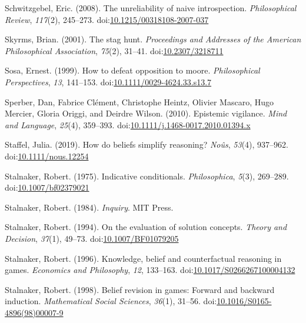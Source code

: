 \documentclass[
  12pt,
  letterpaper,
]{scrbook}
\newlength{\cslhangindent}
\newenvironment{CSLReferences}[2] %
 {\begin{list}{}{%
  \setlength{\itemindent}{0pt}
  \setlength{\leftmargin}{0pt}
  \setlength{\parsep}{0pt}
  \ifodd #1
   \setlength{\leftmargin}{\cslhangindent}
   \setlength{\itemindent}{-1\cslhangindent}
  \fi
  \setlength{\itemsep}{#2\baselineskip}}}
 {\end{list}}
\begin{document}
\begin{CSLReferences}{1}{0}
Schwitzgebel, Eric. (2008). The unreliability of naive introspection.
\emph{Philosophical Review}, \emph{117}(2), 245--273.
doi:\href{https://doi.org/10.1215/00318108-2007-037}{10.1215/00318108-2007-037}

Skyrms, Brian. (2001). The stag hunt. \emph{Proceedings and Addresses of
the American Philosophical Association}, \emph{75}(2), 31--41.
doi:\href{https://doi.org/10.2307/3218711}{10.2307/3218711}

Sosa, Ernest. (1999). How to defeat opposition to moore.
\emph{Philosophical Perspectives}, \emph{13}, 141--153.
doi:\href{https://doi.org/10.1111/0029-4624.33.s13.7}{10.1111/0029-4624.33.s13.7}

Sperber, Dan, Fabrice Clément, Christophe Heintz, Olivier Mascaro, Hugo
Mercier, Gloria Origgi, and Deirdre Wilson. (2010). Epistemic vigilance.
\emph{Mind and Language}, \emph{25}(4), 359--393.
doi:\href{https://doi.org/10.1111/j.1468-0017.2010.01394.x}{10.1111/j.1468-0017.2010.01394.x}

Staffel, Julia. (2019). How do beliefs simplify reasoning?
\emph{No{û}s}, \emph{53}(4), 937--962.
doi:\href{https://doi.org/10.1111/nous.12254}{10.1111/nous.12254}

Stalnaker, Robert. (1975). Indicative conditionals. \emph{Philosophica},
\emph{5}(3), 269--289.
doi:\href{https://doi.org/10.1007/bf02379021}{10.1007/bf02379021}

Stalnaker, Robert. (1984). \emph{Inquiry}. MIT Press.

Stalnaker, Robert. (1994). On the evaluation of solution concepts.
\emph{Theory and Decision}, \emph{37}(1), 49--73.
doi:\href{https://doi.org/10.1007/BF01079205}{10.1007/BF01079205}

Stalnaker, Robert. (1996). Knowledge, belief and counterfactual
reasoning in games. \emph{Economics and Philosophy}, \emph{12},
133--163.
doi:\href{https://doi.org/10.1017/S0266267100004132}{10.1017/S0266267100004132}

Stalnaker, Robert. (1998). Belief revision in games: Forward and
backward induction. \emph{Mathematical Social Sciences}, \emph{36}(1),
31--56.
doi:\href{https://doi.org/10.1016/S0165-4896(98)00007-9}{10.1016/S0165-4896(98)00007-9}


\end{CSLReferences}
\end{document}
